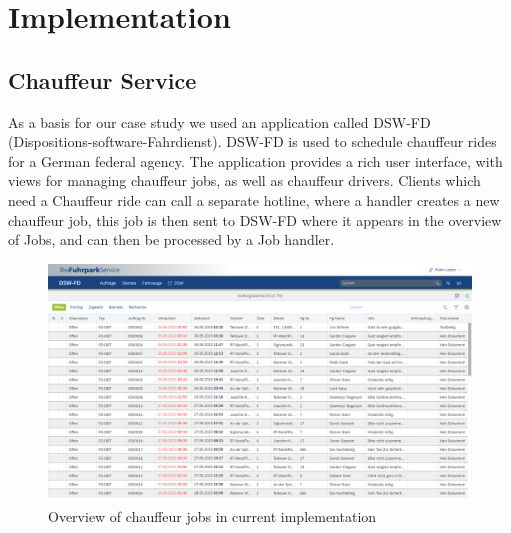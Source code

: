 \chapter{Implementation}
\label{ch:implementation}

\section{Chauffeur Service}


As a basis for our case study we used an application called DSW-FD (Dispositions-software-Fahrdienst). DSW-FD is used to schedule chauffeur rides for a German federal agency. The application provides a rich user interface, with views for managing chauffeur jobs, as well as chauffeur drivers. Clients which need a Chauffeur ride can call a separate hotline, where a handler creates a new chauffeur job, this job is then sent to DSW-FD where it appears in the overview of Jobs, and can then be processed by a Job handler.


\begin{figure}
    \centering
    \includegraphics[width=\linewidth]{assets/current-auftrag-overview}
    \caption{Overview of chauffeur jobs in current implementation}
    \label{fig:current-overview-auftrag}
\end{figure}


